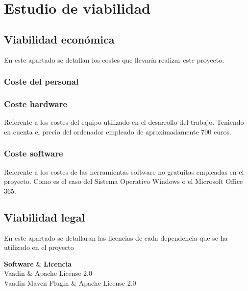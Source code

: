 \section{Estudio de viabilidad}
\subsection{Viabilidad económica}
En este apartado se detallan los costes que llevaría realizar este proyecto.

\subsubsection{Coste del personal}

\subsubsection{Coste hardware}
Referente a los costes del equipo utilizado en el desarrollo del trabajo. Teniendo en cuenta el precio del ordenador empleado de aproximadamente 700 euros.

\subsubsection{Coste software}
Referente a los costes de las herramientas software no gratuitas empleadas en el proyecto. Como es el caso del Sistema Operativo Windows o el Microsoft Office 365.

\subsection{Viabilidad legal}
En este apartado se detallaran las licencias de cada dependencia que se ha utilizado en el proyecto

{\textbf{Software} & \textbf{Licencia} \\}{
	Vaadin & Apache License 2.0 \\
	Vaadin Maven Plugin & Apache License 2.0 \\
}
